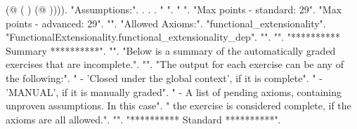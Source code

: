 \documentclass[12pt]{report}
\begin{document}
\begin{coqdoccode}
\coqdocindent{1.50em}
(@  (  ) (@ )))).\coqdoceol
\coqdocnoindent
{} "Assumptions:".\coqdoceol
\coqdocnoindent
{}.\coqdoceol
\coqdocnoindent
{}  .\coqdoceol
\coqdocnoindent
{} .\coqdoceol
\coqdocnoindent
{} " ".\coqdoceol
\coqdocemptyline
\coqdocnoindent
{} " ".\coqdoceol
\coqdocemptyline
\coqdocnoindent
{} "Max points - standard: 29".\coqdoceol
\coqdocnoindent
{} "Max points - advanced: 29".\coqdoceol
\coqdocnoindent
{} "".\coqdoceol
\coqdocnoindent
{} "Allowed Axioms:".\coqdoceol
\coqdocnoindent
{} "functional\_extensionality".\coqdoceol
\coqdocnoindent
{} "FunctionalExtensionality.functional\_extensionality\_dep".\coqdoceol
\coqdocnoindent
{} "".\coqdoceol
\coqdocnoindent
{} "".\coqdoceol
\coqdocnoindent
{} "********** Summary **********".\coqdoceol
\coqdocnoindent
{} "".\coqdoceol
\coqdocnoindent
{} "Below is a summary of the automatically graded exercises that are incomplete.".\coqdoceol
\coqdocnoindent
{} "".\coqdoceol
\coqdocnoindent
{} "The output for each exercise can be any of the following:".\coqdoceol
\coqdocnoindent
{} "  - 'Closed under the global context', if it is complete".\coqdoceol
\coqdocnoindent
{} "  - 'MANUAL', if it is manually graded".\coqdoceol
\coqdocnoindent
{} "  - A list of pending axioms, containing unproven assumptions. In this case".\coqdoceol
\coqdocnoindent
{} "    the exercise is considered complete, if the axioms are all allowed.".\coqdoceol
\coqdocnoindent
{} "".\coqdoceol
\coqdocnoindent
{} "********** Standard **********".\coqdoceol

\end{coqdoccode}
\end{document}
